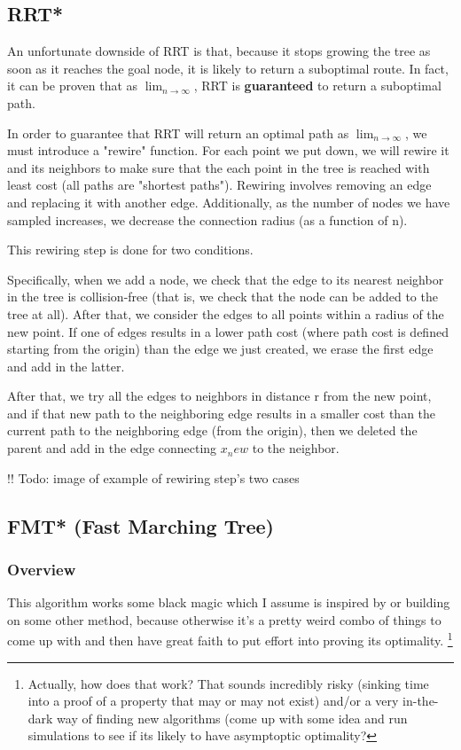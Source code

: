 \documentclass[a4paper]{article}
\begin{document}
\subsection{RRT*}

An unfortunate downside of RRT is that, because it stops growing the tree as
soon as it reaches the goal node, it is likely to return a suboptimal route. In
fact, it can be proven that as $\lim_{n\to \infty}$, RRT is \textbf{guaranteed} to return a suboptimal path. 

In order to guarantee that RRT will return an optimal path as $\lim_{n\to
\infty}$, we must introduce a "rewire" function. For each point we put down, we
will rewire it and its neighbors to make sure that the each point in the tree is
reached with least cost (all paths are "shortest paths"). Rewiring involves
removing an edge and replacing it with another edge. Additionally, as the number
of nodes we have sampled increases, we decrease the connection radius (as a
function of n).

This rewiring step is done for two conditions.

Specifically, when we add a node, we check that the edge to its nearest neighbor
in the tree is collision-free (that is, we check that the node can be added to
the tree at all). After that, we consider the edges to all points within a
radius of the new point. If one of edges results in a lower path cost (where
path cost is defined starting from the origin) than the edge we just created, we
erase the first edge and add in the latter. 

After that, we try all the edges to neighbors in distance r from the new point,
and if that new path to the neighboring edge results in a smaller cost than the
current path to the neighboring edge (from the origin), then we deleted the
parent and add in the edge connecting $x_new$ to the neighbor.

!! Todo: image of example of rewiring step's two cases %

\subsection{FMT* (Fast Marching Tree)}

\subsubsection{Overview}
This algorithm works some black magic which I assume is inspired by or building
on some other method, because otherwise it's a pretty weird combo of things to come up with
and then have great faith to put effort into proving its optimality. \footnote{Actually,
how does that work? That sounds incredibly risky (sinking time into a proof of a
property that may or may not exist) and/or a very in-the-dark way
of finding new algorithms (come up with some idea and run simulations to see if
its likely to have asymptoptic optimality?}
\end{document}

